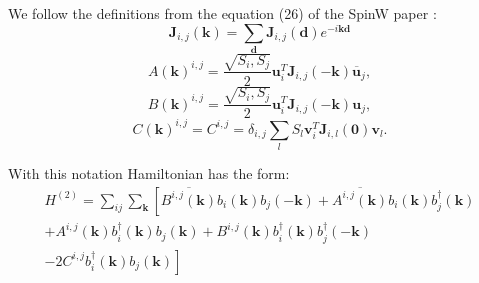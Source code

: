 \documentclass[a4paper,12pt]{article}
\begin{document}
        We follow the definitions from the equation (26) of the SpinW paper \cite{toth2015linear}:
        \begin{equation}
            \boldsymbol{J}_{i,j}(\boldsymbol{k}) = \sum_{\boldsymbol{d}}\boldsymbol{J}_{i,j}(\boldsymbol{d})e^{-i\boldsymbol{k}\boldsymbol{d}}
        \end{equation}
        \begin{equation}
            A(\boldsymbol{k})^{i,j} = \dfrac{\sqrt{S_i, S_j}}{2}\boldsymbol{u}^T_i\boldsymbol{J}_{i,j}(-\boldsymbol{k})\overline{\boldsymbol{u}}_j,
        \end{equation}
        \begin{equation}
            B(\boldsymbol{k})^{i,j} = \dfrac{\sqrt{S_i, S_j}}{2}\boldsymbol{u}^T_i\boldsymbol{J}_{i,j}(-\boldsymbol{k})\boldsymbol{u}_j,
        \end{equation}
        \begin{equation}
            C(\boldsymbol{k})^{i,j} = C^{i,j} = \delta_{i,j}\sum_{l}S_l \boldsymbol{v}^T_i\boldsymbol{J}_{i, l}(\boldsymbol{0})\boldsymbol{v}_l.
        \end{equation}

        With this notation Hamiltonian has the form:
        \begin{multline}
            H^{(2)} = \sum_{ij}\sum_{\boldsymbol{k}}\left[\overline{B^{i,j}(\boldsymbol{k})}b_{i}(\boldsymbol{k})b_{j}(-\boldsymbol{k}) +
            \overline{A^{i,j}(\boldsymbol{k})}b_{i}(\boldsymbol{k})b^{\dag}_{j}(\boldsymbol{k})\right. \\+ 
            A^{i,j}(\boldsymbol{k})b^{\dag}_{i}(\boldsymbol{k})b_{j}(\boldsymbol{k}) +
            B^{i,j}(\boldsymbol{k})b^{\dag}_{i}(\boldsymbol{k})b^{\dag}_{j}(-\boldsymbol{k}) \\-
            \left.2 C^{i,j}b^{\dag}_{i}(\boldsymbol{k})b_{j}(\boldsymbol{k})\right] \label{eq:ham-before}
        \end{multline}
\end{document}
